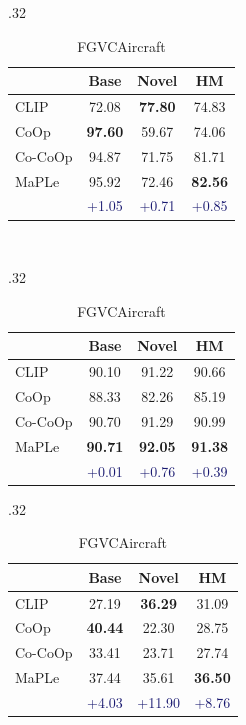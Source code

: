 \documentclass[10pt,twocolumn,letterpaper]{article}
\begin{document}
\begin{table}[t!]
\begin{subtable}[t]{.32\textwidth}
\begin{tabular}{l cc|c}
    & Base & Novel & HM \\
    \midrule
    CLIP & 72.08 & \textbf{77.80} & 74.83 \\
    CoOp & \textbf{97.60} & 59.67 & 74.06 \\
    Co-CoOp & 94.87 & 71.75 & {81.71} \\
    \midrule
        \rowcolor{tabhighlight}
    MaPLe & 95.92 & 72.46 & \textbf{82.56} \\
     &  \textcolor{MidnightBlue}{{+1.05}} &  \textcolor{MidnightBlue}{{+0.71}} &  \textcolor{MidnightBlue}{{+0.85}} \\
    \bottomrule
    \end{tabular}
    \end{subtable}
    ~
    \begin{subtable}[t]{.32\textwidth}
    \centering
    \caption{Food101}
    \begin{tabular}{l cc|c}
    \toprule
    & Base & Novel & HM \\
    \midrule
    CLIP & 90.10 & 91.22 & 90.66 \\
    CoOp & 88.33 & 82.26 & 85.19 \\
    Co-CoOp & {90.70} & {91.29} & {90.99} \\
    \midrule
        \rowcolor{tabhighlight}
    MaPLe & \textbf{90.71} & \textbf{92.05} & \textbf{91.38} \\
     &  \textcolor{MidnightBlue}{{+0.01}} &  \textcolor{MidnightBlue}{{+0.76}} &  \textcolor{MidnightBlue}{{+0.39}} \\
    \bottomrule
    \end{tabular}
    \end{subtable}
    \vspace{1em}
    \begin{subtable}[t]{.32\textwidth}
    \centering
    \caption{FGVCAircraft}
    \begin{tabular}{l cc|c}
    \toprule
    & Base & Novel & HM \\
    \midrule
    CLIP & 27.19 & \textbf{36.29} & {31.09} \\
    CoOp & \textbf{40.44} & 22.30 & 28.75 \\
    Co-CoOp & 33.41 & 23.71 & 27.74 \\
    \midrule
        \rowcolor{tabhighlight}
    MaPLe & 37.44 & 35.61 & \textbf{36.50} \\
      &  \textcolor{MidnightBlue}{{+4.03}} &  \textcolor{MidnightBlue}{{+11.90}} &  \textcolor{MidnightBlue}{{+8.76}} \\
    \bottomrule

\end{tabular}
\end{subtable}
\end{table}
\end{document}
